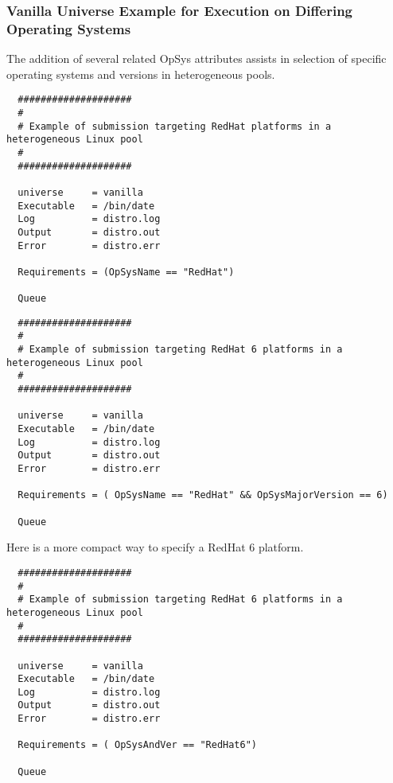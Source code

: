 \subsubsection{Vanilla Universe Example for Execution on Differing Operating Systems} 

The addition of several related OpSys attributes assists in selection of specific operating systems and versions in heterogeneous pools.


\begin{verbatim}
  ####################
  #
  # Example of submission targeting RedHat platforms in a heterogeneous Linux pool
  #
  ####################

  universe     = vanilla
  Executable   = /bin/date
  Log          = distro.log
  Output       = distro.out
  Error        = distro.err

  Requirements = (OpSysName == "RedHat")

  Queue
\end{verbatim}


\begin{verbatim}
  ####################
  #
  # Example of submission targeting RedHat 6 platforms in a heterogeneous Linux pool
  #
  ####################

  universe     = vanilla
  Executable   = /bin/date
  Log          = distro.log
  Output       = distro.out
  Error        = distro.err

  Requirements = ( OpSysName == "RedHat" && OpSysMajorVersion == 6)

  Queue
\end{verbatim}


Here is a more compact way to specify a RedHat 6 platform.

\begin{verbatim}
  ####################
  #
  # Example of submission targeting RedHat 6 platforms in a heterogeneous Linux pool
  #
  ####################

  universe     = vanilla
  Executable   = /bin/date
  Log          = distro.log
  Output       = distro.out
  Error        = distro.err

  Requirements = ( OpSysAndVer == "RedHat6")

  Queue
\end{verbatim}



